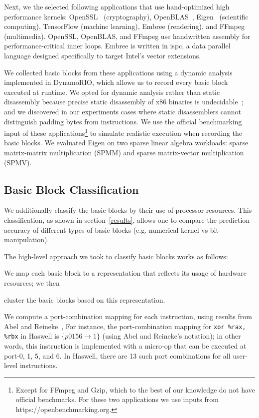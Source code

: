 Next, we the selected following applications that use hand-optimized high performance kernels:
OpenSSL~\cite{openssl} (cryptography), OpenBLAS~\cite{openblas}, Eigen~\cite{eigen} (scientific computing),
TensorFlow\cite{tensorflow} (machine learning),
Embree\cite{embree} (rendering), and FFmpeg (multimedia).
OpenSSL, OpenBLAS, and FFmpeg use handwritten assembly for performance-critical inner loops.
Embree is written in ispc\cite{ispc}, a data parallel language
designed specifically to target Intel's vector extensions.

We collected basic blocks from these applications using
a dynamic analysis implemented in DynamoRIO\cite{dynamorio},
which allows us to record every basic block
executed at runtime.
We opted for dynamic analysis rather than static disassembly
because precise static disassembly of x86 binaries
is undecidable~\cite{disassembly-undecidable};
and we discovered in our experiments cases where
static disassemblers cannot distinguish padding bytes from instructions.
We use the official benchmarking input of these applications\footnote{
Except for FFmpeg and Gzip, which to the best of our knowledge do not have
official benchmarks. For these two applications we use inputs
from https://openbenchmarking.org.
} to simulate realistic execution when recording the basic blocks.
We evaluated Eigen on two sparse linear algebra workloads:
sparse matrix-matrix multiplication (SPMM) and 
sparse matrix-vector multiplication (SPMV).

\subsection{Basic Block Classification}\label{classification}
We additionally classify the basic blocks by their use of processor resources.
This classification, as shown in section~\ref{results},
allows one to compare the prediction accuracy of different types of basic blocks 
(e.g. numerical kernel vs bit-manipulation).

The high-level approach we took to classify basic blocks works as follows:
\begin{enumerate*}
\item We map each basic block to a representation
that reflects its usage of hardware resources; we then
\item cluster the basic blocks based on this representation.
\end{enumerate*}

We compute a port-combination mapping for each instruction,
using results from Abel and Reineke~\cite{uops},
For instance,
the port-combination mapping for \verb|xor %rax, %rbx| in Haswell
is $\{ p0156 \rightarrow 1 \}$ (using Abel and Reineke's notation);
in other words, this instruction is implemented 
with a micro-op that can be executed at port-0, 1, 5, and 6.
In Haswell, there are 13 such port combinations for all user-level instructions.

